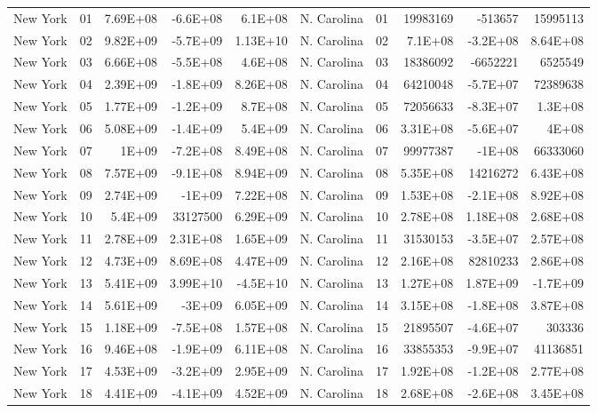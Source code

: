 \begin{landscape}
\begin{singlespace}
\begin{longtable}{lrrrr|lrrrr}
		New York &  01  & 7.69E+08 & -6.6E+08 & 6.1E+08 & N. Carolina &  01  & 19983169 & -513657 & 15995113 \\
		New York &  02  & 9.82E+09 & -5.7E+09 & 1.13E+10 & N. Carolina &  02  & 7.1E+08 & -3.2E+08 & 8.64E+08 \\
		New York &  03  & 6.66E+08 & -5.5E+08 & 4.6E+08 & N. Carolina &  03  & 18386092 & -6652221 & 6525549 \\
		New York &  04  & 2.39E+09 & -1.8E+09 & 8.26E+08 & N. Carolina &  04  & 64210048 & -5.7E+07 & 72389638 \\
		New York &  05  & 1.77E+09 & -1.2E+09 & 8.7E+08 & N. Carolina &  05  & 72056633 & -8.3E+07 & 1.3E+08 \\
		New York &  06  & 5.08E+09 & -1.4E+09 & 5.4E+09 & N. Carolina &  06  & 3.31E+08 & -5.6E+07 & 4E+08 \\
		New York &  07  & 1E+09 & -7.2E+08 & 8.49E+08 & N. Carolina &  07  & 99977387 & -1E+08 & 66333060 \\
		New York &  08  & 7.57E+09 & -9.1E+08 & 8.94E+09 & N. Carolina &  08  & 5.35E+08 & 14216272 & 6.43E+08 \\
		New York &  09  & 2.74E+09 & -1E+09 & 7.22E+08 & N. Carolina &  09  & 1.53E+08 & -2.1E+08 & 8.92E+08 \\
		New York &  10 & 5.4E+09 & 33127500 & 6.29E+09 & N. Carolina &  10 & 2.78E+08 & 1.18E+08 & 2.68E+08 \\
		New York &  11 & 2.78E+09 & 2.31E+08 & 1.65E+09 & N. Carolina &  11 & 31530153 & -3.5E+07 & 2.57E+08 \\
		New York &  12 & 4.73E+09 & 8.69E+08 & 4.47E+09 & N. Carolina &  12 & 2.16E+08 & 82810233 & 2.86E+08 \\
		New York &  13 & 5.41E+09 & 3.99E+10 & -4.5E+10 & N. Carolina &  13 & 1.27E+08 & 1.87E+09 & -1.7E+09 \\
		New York &  14 & 5.61E+09 & -3E+09 & 6.05E+09 & N. Carolina &  14 & 3.15E+08 & -1.8E+08 & 3.87E+08 \\
		New York &  15 & 1.18E+09 & -7.5E+08 & 1.57E+08 & N. Carolina &  15 & 21895507 & -4.6E+07 & 303336 \\
		New York &  16 & 9.46E+08 & -1.9E+09 & 6.11E+08 & N. Carolina &  16 & 33855353 & -9.9E+07 & 41136851 \\
		New York &  17 & 4.53E+09 & -3.2E+09 & 2.95E+09 & N. Carolina &  17 & 1.92E+08 & -1.2E+08 & 2.77E+08 \\
		New York &  18 & 4.41E+09 & -4.1E+09 & 4.52E+09 & N. Carolina &  18 & 2.68E+08 & -2.6E+08 & 3.45E+08 \\

\end{longtable}
\end{singlespace}
\end{landscape}
